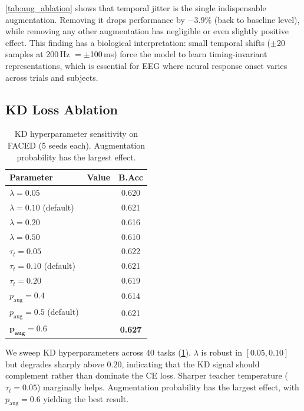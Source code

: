 \cref{tab:aug_ablation} shows that temporal jitter is the single indispensable augmentation. Removing it drops performance by $-3.9\%$ (back to baseline level), while removing any other augmentation has negligible or even slightly positive effect. This finding has a biological interpretation: small temporal shifts ($\pm$20 samples at 200\,Hz $= \pm$100\,ms) force the model to learn timing-invariant representations, which is essential for EEG where neural response onset varies across trials and subjects.

\subsection{KD Loss Ablation}
\label{sec:kd_ablation}
\vspace{-1mm}

\begin{table}
  \centering
  \vspace{-5mm}
  \caption{KD hyperparameter sensitivity on FACED (5 seeds each). Augmentation probability has the largest effect.}
  \small
  \begin{tabular}{lcc}
  \toprule
  Parameter & Value & B.Acc \\
  \midrule
  $\lambda = 0.05$ & & 0.620 \\
  $\lambda = 0.10$ (default) & & 0.621 \\
  $\lambda = 0.20$ & & 0.616 \\
  $\lambda = 0.50$ & & 0.610 \\
  \midrule
  $\tau_t = 0.05$ & & 0.622 \\
  $\tau_t = 0.10$ (default) & & 0.621 \\
  $\tau_t = 0.20$ & & 0.619 \\
  \midrule
  $p_{\text{aug}} = 0.4$ & & 0.614 \\
  $p_{\text{aug}} = 0.5$ (default) & & 0.621 \\
  $\mathbf{p_{\text{aug}} = 0.6}$ & & \textbf{0.627} \\
  \bottomrule
  \end{tabular}
  \label{tab:kd_ablation}
\end{table}

We sweep KD hyperparameters across 40 tasks (\cref{tab:kd_ablation}). $\lambda$ is robust in $[0.05, 0.10]$ but degrades sharply above $0.20$, indicating that the KD signal should complement rather than dominate the CE loss. Sharper teacher temperature ($\tau_t = 0.05$) marginally helps. Augmentation probability has the largest effect, with $p_{\text{aug}} = 0.6$ yielding the best result.

